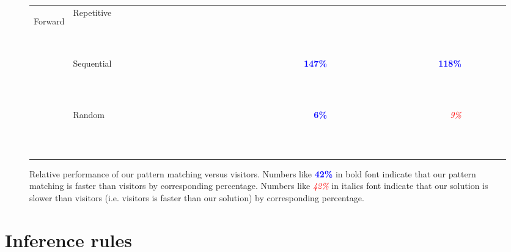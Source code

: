 \documentclass{article}
\newcommand{\f}[1]{{\scriptsize {\bf \textcolor{blue}{#1\%}}}}
\newcommand{\s}[1]{{\scriptsize {\em \textcolor{red}{#1\%}}}}
\newcommand{\n}[1]{{\scriptsize {\bf ~ ~ ~ ~ }}}
\begin{document}
\begin{figure*}
\begin{tabular}{@{}c@{ }l||@{ }r@{}@{ }r@{}@{ }r@{}|@{ }r@{}@{ }r@{}@{ }r@{}||@{ }r@{}@{ }r@{}@{ }r@{}|@{ }r@{}@{ }r@{}@{ }r@{}||@{ }r@{}@{ }r@{}@{ }r@{}|@{ }r@{}@{ }r@{}@{ }r@{}}
\hline %
\multirow{3}{*}{\begin{sideways}{\tiny Forward}\end{sideways}}
 & Repetitive &\n{   }&\n{   }&\n{   }&\n{   }&\n{   }&\n{   }&\n{   }&\n{   }&\n{   }&\n{   }&\n{   }&\n{   }&\n{   }&\n{   }&\n{   }&\n{   }&\n{   }&\n{   } \\
 & Sequential &\n{   }&\n{   }&\n{   }&\n{   }&\n{   }&\n{   }&\n{   }&\n{   }&\n{   }&\f{147}&\n{   }&\n{   }&\n{   }&\n{   }&\n{   }&\f{118}&\n{   }&\n{   } \\
 & Random     &\n{   }&\n{   }&\n{   }&\n{   }&\n{   }&\n{   }&\n{   }&\n{   }&\n{   }&\f{  6}&\n{   }&\n{   }&\n{   }&\n{   }&\n{   }&\s{  9}&\n{   }&\n{   } \\
\hline %
\end{tabular}
\caption{Relative performance of our pattern matching versus visitors. Numbers 
like \f{42} in bold font indicate that our pattern matching is faster than 
visitors by corresponding percentage. Numbers like \s{42} in italics font 
indicate that our solution is slower than visitors (i.e. visitors is faster than 
our solution) by corresponding percentage.}
\label{relperf}
\end{figure*}

\section{Inference rules}
\end{document}
